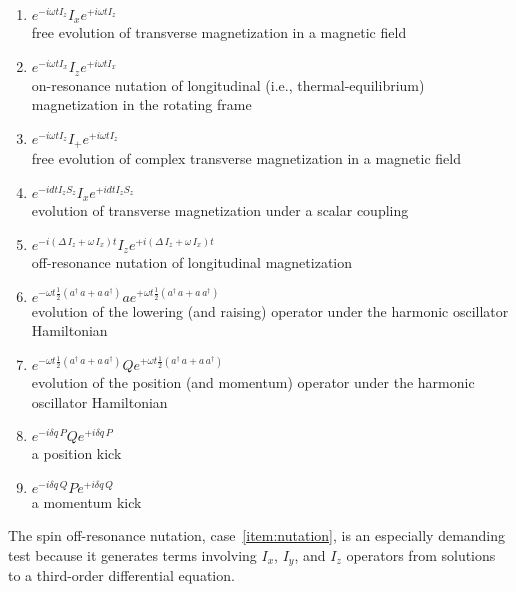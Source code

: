 \documentclass[12pt,letterpaper]{refart}
\begin{document}
\begin{enumerate}
\item $e^{-i\omega t I_z } I_x e^{+i \omega t I_z}$ \\
  free evolution of transverse magnetization in a magnetic field
\item $e^{-i \omega t I_x} I_z e^{+i \omega t I_x}$ \\
  on-resonance nutation of longitudinal (i.e., thermal-equilibrium) magnetization in the rotating frame
\item $e^{-i \omega t I_z} I_{+} e^{+i \omega t I_z}$ \\
  free evolution of complex transverse magnetization in a magnetic field 
\item $e^{-i d t I_z S_z} I_x e^{+i d t I_z S_z}$ \\
  evolution of transverse magnetization under a scalar coupling
\item $e^{-i (\Delta \, I_z + \omega \, I_x) t} I_z e^{+i (\Delta \, I_z + \omega \, I_x) t}$ \\
  \label{item:nutation}
 off-resonance nutation of longitudinal magnetization
\item $e^{- \omega t \frac{1}{2} (a^{\dagger} \, a + a \, a^{\dagger})} a e^{+ \omega t \frac{1}{2} (a^{\dagger} \, a + a \, a^{\dagger})}$  \\
  evolution of the lowering (and raising) operator under the harmonic oscillator Hamiltonian
 \item $e^{- \omega t \frac{1}{2} (a^{\dagger} \, a + a \, a^{\dagger})} Q e^{+ \omega t \frac{1}{2} (a^{\dagger} \, a + a \, a^{\dagger})}$ \\
 evolution of the position (and momentum) operator under the harmonic oscillator Hamiltonian
 \item $e^{-i \delta q \, P }  Q e^{+i \delta q \, P }$ \\
  a position kick
\item $e^{-i \delta q \, Q }  P e^{+i \delta q \, Q }$ \\
  a momentum kick
\end{enumerate}
The spin off-resonance nutation, case~\ref{item:nutation},  is an especially demanding test because it generates terms involving $I_x$, $I_y$, and $I_z$ operators from solutions to a third-order differential equation.




\clearpage
\renewcommand*{\bibfont}{\raggedright\normalfont\small}


\end{document}
